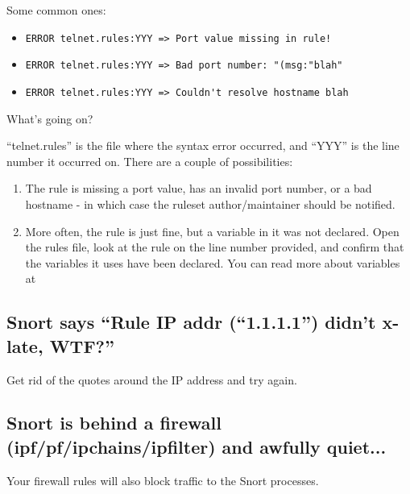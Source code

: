 \documentclass{article}
\begin{document}
Some common ones:

\begin{itemize}
\item \begin{verbatim}ERROR telnet.rules:YYY => Port value missing in rule!\end{verbatim}
\item \begin{verbatim}ERROR telnet.rules:YYY => Bad port number: "(msg:"blah"\end{verbatim}
\item \begin{verbatim}ERROR telnet.rules:YYY => Couldn't resolve hostname blah\end{verbatim}
\end{itemize}

What's going on?

``telnet.rules'' is the file where the syntax error occurred, and ``YYY'' is the 
line number it occurred on.  There are a couple of possibilities:

\begin{enumerate}
\item The rule is missing a port value, has an invalid port number, or a bad hostname - in which case the ruleset author/maintainer should be notified.

\item More often, the rule is just fine, but a variable in it was not declared.  Open the rules file, look at the rule on the line number provided, and confirm that the variables it uses have been declared.  You can read more about variables at 
\end{enumerate}

\subsection{Snort says ``Rule IP addr (``1.1.1.1'') didn't x-late, WTF?''}

Get rid of the quotes around the IP address and try again.

\subsection{Snort is behind a firewall (ipf/pf/ipchains/ipfilter) and awfully quiet...}

Your firewall rules will also block traffic to the Snort processes.
\end{document}

